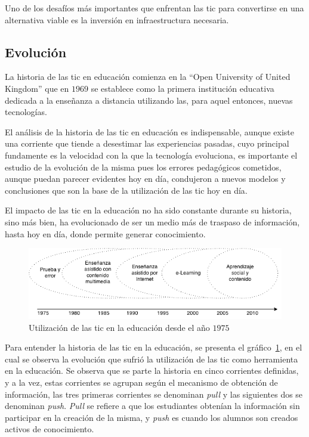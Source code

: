 Uno de los desafíos más importantes que enfrentan las \Gls{tic} para convertirse
en una alternativa viable es la inversión en infraestructura
necesaria\cite{unesco:ict}.

\subsection{Evolución}

La historia de las \Gls{tic} en educación comienza en la \enquote{Open
    University of United Kingdom} que en $1969$ se establece como la primera
institución educativa dedicada a la enseñanza a distancia utilizando las, para
aquel entonces, nuevas tecnologías\cite{tinio:ict}. 

El análisis de la historia de las \Gls{tic} en educación es indispensable,
aunque existe una corriente que tiende a desestimar las experiencias pasadas,
cuyo principal fundamente es la velocidad con la que la tecnología evoluciona,
es importante el estudio de la evolución de la misma pues los errores
pedagógicos cometidos, aunque puedan parecer evidentes hoy en día, condujeron a
nuevos modelos y conclusiones que son la base de la utilización de las \Gls{tic}
hoy en día\cite{mcdougall2006theory}.

El impacto de las \Gls{tic} en la educación no ha sido constante durante su
historia, sino más bien, ha evolucionado de ser un medio más de traspaso de
información, hasta hoy en día, donde permite generar
conocimiento\cite{tinio:ict}.

\begin{figure}
    \centering
    \includegraphics[scale=0.75]{tics/images/tics_history.png}
    \caption{Utilización de las \Gls{tic} en la educación desde el año $1975$}
    \label{fig:history_tics}
\end{figure}

Para entender la historia de las \Gls{tic} en la educación, se presenta el
gráfico~\ref{fig:history_tics}, en el cual se observa la evolución que sufrió la
utilización de las \Gls{tic} como herramienta en la educación. Se observa que se
parte la historia en cinco corrientes definidas, y a la vez, estas corrientes se
agrupan según el mecanismo de obtención de información, las tres primeras
corrientes se denominan \textit{pull} y las siguientes dos se denominan
\textit{push}. \textit{Pull} se refiere a que los estudiantes obtenían la
información sin participar en la creación de la misma, y \textit{push} es cuando
los alumnos son creados activos de conocimiento\cite{white:ict,leinonen:ict}.

